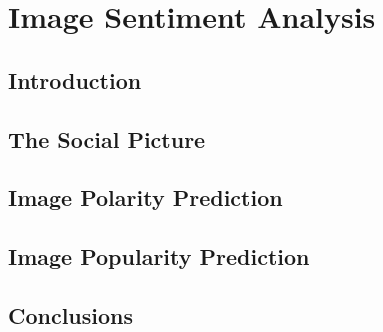 \chapter{Image Sentiment Analysis}

\section{Introduction}

\section{The Social Picture}

\section{Image Polarity Prediction}

\section{Image Popularity Prediction}

\section{Conclusions}